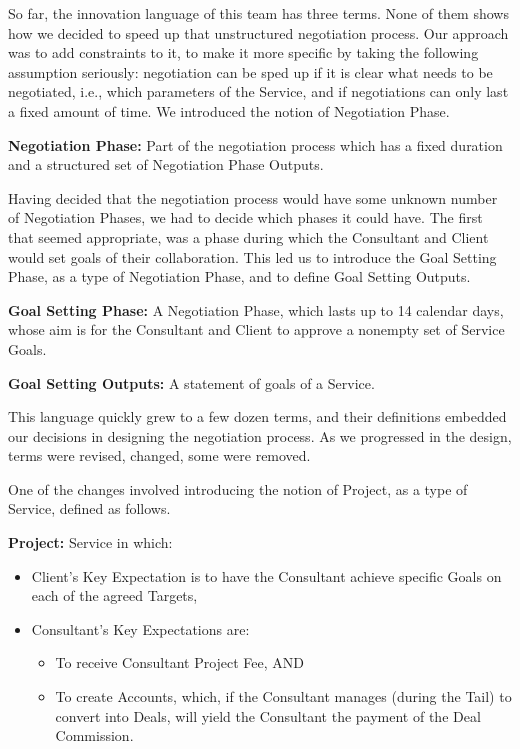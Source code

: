 \documentclass[graybox,envcountchap,sectrefs]{svmono}
\begin{document}

So far, the innovation language of this team has three terms. None of them shows how we decided to speed up that unstructured negotiation process. Our approach was to add constraints to it, to make it more specific by taking the following assumption seriously: negotiation can be sped up if it is clear what needs to be negotiated, i.e., which parameters of the Service, and if negotiations can only last a fixed amount of time. We introduced the notion of Negotiation Phase.

\begin{svgraybox}
\textbf{Negotiation Phase:} Part of the negotiation process which has a fixed duration and a structured set of Negotiation Phase Outputs.
\end{svgraybox}

Having decided that the negotiation process would have some unknown number of Negotiation Phases, we had to decide which phases it could have. The first that seemed appropriate, was a phase during which the Consultant and Client would set goals of their collaboration. This led us to introduce the Goal Setting Phase, as a type of Negotiation Phase, and to define Goal Setting Outputs.

\begin{svgraybox}
\textbf{Goal Setting Phase:} A Negotiation Phase, which lasts up to 14 calendar days, whose aim is for the Consultant and Client to approve a nonempty set of Service Goals.
\end{svgraybox}

\begin{svgraybox}
\textbf{Goal Setting Outputs:} A statement of goals of a Service.
\end{svgraybox}

This language quickly grew to a few dozen terms, and their definitions embedded our decisions in designing the negotiation process. As we progressed in the design, terms were revised, changed, some were removed.

One of the changes involved introducing the notion of Project, as a type of Service, defined as follows.

\begin{svgraybox}
\textbf{Project:} Service in which:
\begin{itemize}
\item Client's Key Expectation is to have the Consultant achieve specific Goals on each of the agreed Targets,
\item Consultant's Key Expectations are:
\begin{itemize}
	\item To receive Consultant Project Fee, AND
	\item To create Accounts, which, if the Consultant manages (during the Tail) to convert into Deals, will yield the Consultant the payment of the Deal Commission.
\end{itemize}
\end{itemize}
\end{svgraybox}
\end{document}

